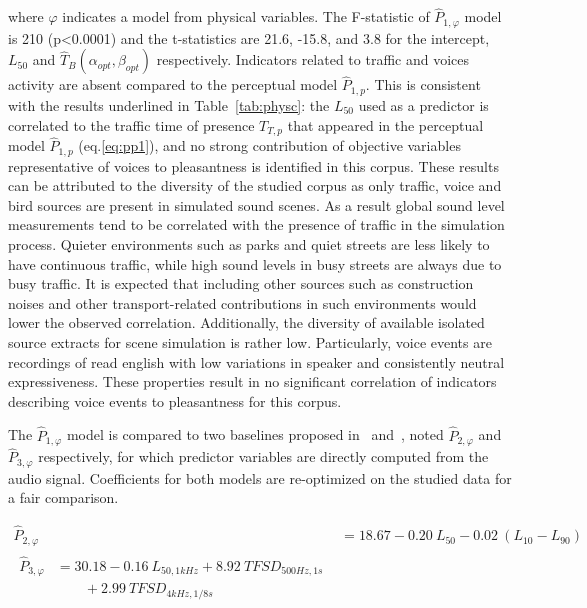 \documentclass[twocolumn]{article}
\begin{document}
where $\varphi$ indicates a model from physical variables. The F-statistic of $\hat P_{1, \varphi}$ model is 210 (p<0.0001) and the t-statistics are 21.6, -15.8, and 3.8 for the intercept, $L_{50}$ and $\hat T_B(\alpha_{opt}, \beta_{opt})$ respectively. Indicators related to traffic and voices activity are absent compared to the perceptual model $\hat P_{1, p}$. This is consistent with the results underlined in Table~\ref{tab:physc}: the $L_{50}$ used as a predictor is correlated to the traffic time of presence $T_{T, p}$ that appeared in the perceptual model $\hat P_{1, p}$ (eq.\ref{eq:pp1}), and no strong contribution of objective variables representative of voices to pleasantness is identified in this corpus. These results can be attributed to the diversity of the studied corpus as only traffic, voice and bird sources are present in simulated sound scenes. As a result global sound level measurements tend to be correlated with the presence of traffic in the simulation process. Quieter environments such as parks and quiet streets are less likely to have continuous traffic, while high sound levels in busy streets are always due to busy traffic. It is expected that including other sources such as construction noises and other transport-related contributions in such environments would lower the observed correlation. Additionally, the diversity of available isolated source extracts for scene simulation is rather low. Particularly, voice events are recordings of read english with low variations in speaker and consistently neutral expressiveness. These properties result in no significant correlation of indicators describing voice events to pleasantness for this corpus.

The $\hat P_{1, \varphi}$ model is compared to two baselines proposed in~\cite{ricciardi2014} and~\cite{aumond2017}, noted $\hat P_{2, \varphi}$ and $\hat P_{3, \varphi}$ respectively, for which predictor variables are directly computed from the audio signal. Coefficients for both models are re-optimized on the studied data for a fair comparison. 

\begin{align}
\hat P_{2, \varphi} &= 18.67 - 0.20~L_{50} - 0.02~(L_{10}-L_{90})\\
\begin{split}
\hat P_{3, \varphi} &= 30.18 - 0.16~L_{50, 1kHz} + 8.92~TFSD_{500Hz, 1s} \\
&\qquad + 2.99~TFSD_{4kHz, 1/8s}
\end{split}
\end{align}
\end{document}
